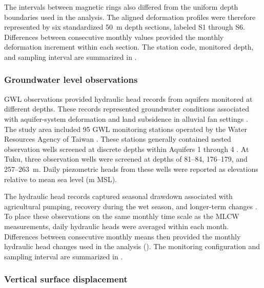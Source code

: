 The intervals between magnetic rings also differed from the uniform depth boundaries used in the analysis. The aligned deformation profiles were therefore represented by six standardized 50~m depth sections, labeled S1 through S6. Differences between consecutive monthly values provided the monthly deformation increment within each section. The station code, monitored depth, and sampling interval are summarized in .

\subsubsection{Groundwater level observations}

GWL observations provided hydraulic head records from aquifers monitored at different depths. These records represented groundwater conditions associated with aquifer-system deformation and land subsidence in alluvial fan settings \citep{galloway_land_1999, gambolati_2015, herrera-garcia_mapping_2021, bagheri-gavkoshLandSubsidenceGlobal2021}. The study area included 95 GWL monitoring stations operated by the Water Resources Agency of Taiwan \citep{nguyen_quantitative_2024}. These stations generally contained nested observation wells screened at discrete depths within Aquifers 1 through 4 \citep{survey_project_1999, liu_characterization_2004}. At Tuku, three observation wells were screened at depths of 81--84, 176--179, and 257--263~m. Daily piezometric heads from these wells were reported as elevations relative to mean sea level (m MSL).

The hydraulic head records captured seasonal drawdown associated with agricultural pumping, recovery during the wet season, and longer-term changes \citep{chang2022_wetanddry, lu2020_crfp}. To place these observations on the same monthly time scale as the MLCW measurements, daily hydraulic heads were averaged within each month. Differences between consecutive monthly means then provided the monthly hydraulic head changes used in the analysis (). The monitoring configuration and sampling interval are summarized in .

\subsubsection{Vertical surface displacement}

